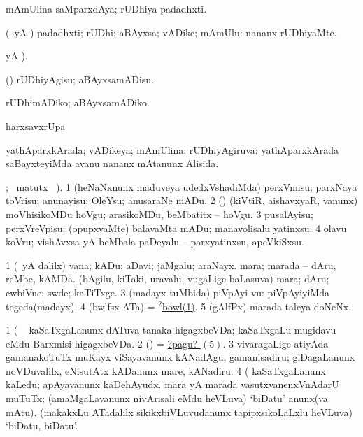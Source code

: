 \noindent
\gl{\pagu}
\expl{}
\bmng
{} mAmUlina saMparxdAya; rUDhiya padadhxti. 
\emng
\eentry

\bentry
{} 
\gl{\nA}
\expl{}
\bmng
(\aupa\ yA \hA) padadhxti; rUDhi; aBAyxsa; vADike; mAmUlu:  nananx rUDhiyaMte. 
\emng
\eentry

\bentry
{} 
\gl{\kirx}
 yA ).

\noindent
\gl{\sakirx}
\bmng
(\pArxparx) rUDhiyAgisu; aBAyxsamADisu. 
\emng

\noindent
\gl{\akirx}
\expl{}
\bmng
rUDhimADiko; aBAyxsamADiko. 
\emng
\eentry

\bentry
{} 
\bmng
harxsavxrUpa  
\emng
\eentry

\bentry
{} 
\gl{\gu}
\expl{}
\bmng
yathAparxkArada; vADikeya; mAmUlina; rUDhiyAgiruva:  yathAparxkArada saBayxteyiMda avanu nananx mAtanunx Alisida. 
\emng
\eentry

\bentry
{} 
\gl{\sakirx}
 ; \BU\ matutx \BUkaq\ ).\bmng
\bnum
\num{1} (heNaNxnunx maduveya udedxVshadiMda) perxVmisu; parxNaya toVrisu; anunayisu; OleYsu; anusaraNe mADu. 
\num{2} (\rUpa) (kiVtiR, aishavxyaR, \mo vanunx) moVhisikoMDu hoVgu; arasikoMDu, beMbatitx -- hoVgu. 
\num{3} pusalAyisu; perxVreVpisu; (opupxvaMte) balavaMta mADu; manavolisalu yatinxsu. 
\num{4} olavu koVru; vishAvxsa yA beMbala paDeyalu -- parxyatinxsu, apeVkiSxsu. 
\enum
\emng
\eentry

\bentry
{} 
\gl{\nA}
\expl{}
\bmng
\bnum
\num{1} (\Eva\ yA \bava dalilx) vana; kADu; aDavi; jaMgalu; araNayx. 
\banum
{} mara; marada -- dAru, reMbe, kAMDa. 
 (bAgilu, kiTaki, uravalu, \mo vugaLige baLasuva) mara; dAru; cwbiVne; swde; kaTiTxge. 
\eanum
\numie
\num{3} (madayx tuMbida) piVpAyi \mo vu:  piVpAyiyiMda tegeda(madayx). 
\num{4} (bwlfsx ATa) = \hyperref{kandict_b.pdf}{B}{bowl(2)}{$^2$bowl(1)}. 
\num{5} (gAlfPx) marada taleya doNeNx. 
\enum
\emng

\noindent
\gl{\pagu}
\expl{}
\bmng
{} 
\bnum
\num{1}  ( \ame\  kaSaTxgaLanunx dATuva tanaka higagxbeVDa; kaSaTxgaLu mugidavu eMdu Barxmisi higagxbeVDa. 
\num{2}  (\ame) = \hyperlink{wood pagu5}{?pagu? \((5)\)}. 
\num{3}  vivaragaLige atiyAda gamanakoTuTx muKayx viSayavanunx kANadAgu, gamanisadiru; giDagaLanunx noVDuvalilx, eNisutAtx kADanunx mare, kANadiru. 
\num{4}  (  kaSaTxgaLanunx kaLedu; apAyavanunx kaDehAyudx. 
\hypertarget{wood pagu5}{} 
  
\banum
{} mara yA marada vasutxvanenxVnAdarU muTuTx; (amaMgaLavanunx nivArisali eMdu heVLuva) `biDatu' anunx(va mAtu). 
 (makakxLu ATadalilx sikikxbiVLuvudanunx tapipxsikoLaLxlu heVLuva) `biDatu, biDatu'. 
\eanum
\numie
\enum
\emng
\eentry

